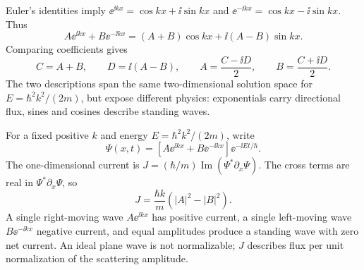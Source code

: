 Euler's identities imply
$\ee^{\ii kx}=\cos kx+\ii\sin kx$ and
$\ee^{-\ii kx}=\cos kx-\ii\sin kx$. Thus
\begin{equation}
A\ee^{\ii kx}+B\ee^{-\ii kx}
=(A+B)\cos kx+\ii(A-B)\sin kx.
\end{equation}
Comparing coefficients gives
\begin{equation}
\boxed{C=A+B,\qquad D=\ii(A-B)},\qquad
\boxed{A=\frac{C-\ii D}{2},\qquad
B=\frac{C+\ii D}{2}}.
\end{equation}
The two descriptions span the same two-dimensional solution
space for $E=\hbar^2k^2/(2m)$, but expose different physics:
exponentials carry directional flux, sines and cosines
describe standing waves.

For a fixed positive $k$ and energy $E=\hbar^2k^2/(2m)$,
write
\begin{equation}
\Psi(x,t)=[A\ee^{\ii kx}+B\ee^{-\ii kx}]
\ee^{-\ii Et/\hbar}.
\end{equation}
The one-dimensional current is
$J=(\hbar/m)\operatorname{Im}(\Psi^*\partial_x\Psi)$.
The cross terms are real in $\Psi^*\partial_x\Psi$, so
\begin{equation}
\boxed{J=\frac{\hbar k}{m}(|A|^2-|B|^2)}.
\end{equation}
A single right-moving wave $A\ee^{\ii kx}$ has positive
current, a single left-moving wave $B\ee^{-\ii kx}$
negative current, and equal amplitudes produce a standing
wave with zero net current. An ideal plane wave is not
normalizable; $J$ describes flux per unit normalization
of the scattering amplitude.

